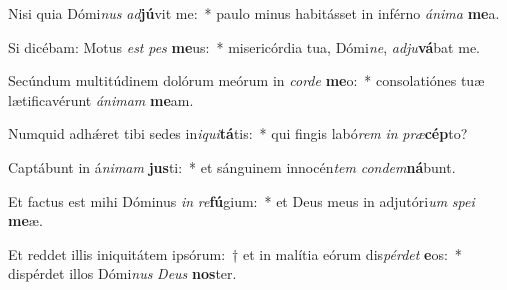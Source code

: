 \item Nisi quia Dómi\textit{nus} \textit{ad}\textbf{jú}vit me:~* paulo minus habitásset in inférno \textit{á}\textit{ni}\textit{ma} \textbf{me}a.
\item Si dicébam: Motus \textit{est} \textit{pes} \textbf{me}us:~* misericórdia tua, Dómi\textit{ne}, \textit{ad}\textit{ju}\textbf{vá}bat me.
\item Secúndum multitúdinem dolórum meórum in \textit{cor}\textit{de} \textbf{me}o:~* consolatiónes tuæ lætificavérunt \textit{á}\textit{ni}\textit{mam} \textbf{me}am.
\item Numquid adhǽret tibi sedes in\textit{i}\textit{qui}\textbf{tá}tis:~* qui fingis labó\textit{rem} \textit{in} \textit{præ}\textbf{cép}to?
\item Captábunt in á\textit{ni}\textit{mam} \textbf{jus}ti:~* et sánguinem innocén\textit{tem} \textit{con}\textit{dem}\textbf{ná}bunt.
\item Et factus est mihi Dóminus \textit{in} \textit{re}\textbf{fú}gium:~* et Deus meus in adjutóri\textit{um} \textit{spe}\textit{i} \textbf{me}æ.
\item Et reddet illis iniquitátem ipsórum:~† et in malítia eórum dis\textit{pér}\textit{det} \textbf{e}os:~* dispérdet illos Dómi\textit{nus} \textit{De}\textit{us} \textbf{nos}ter.
